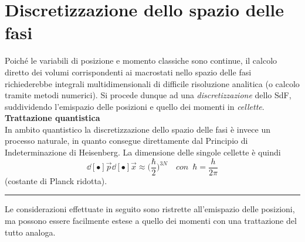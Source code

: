 \documentclass[10pt, oneside]{book}
\newcommand{\infobox}[2]{\vspace{0.5cm}~\\ \textbf{#1} \hrulefill \vspace{0.2cm}\\#2 {}\,\\\hrule \vspace{0.5cm}}
\begin{document}
\section{Discretizzazione dello spazio delle fasi}
Poiché le variabili di posizione e momento classiche sono continue, il calcolo diretto dei volumi corrispondenti ai macrostati nello spazio delle fasi richiederebbe integrali multidimensionali di difficile risoluzione analitica (o calcolo tramite metodi numerici). Si procede dunque ad una \textit{discretizzazione} dello SdF, suddividendo l'emispazio delle posizioni e quello dei momenti in \textit{cellette}. 
\infobox{Trattazione quantistica}{In ambito quantistico la discretizzazione dello spazio delle fasi è invece un processo naturale, in quanto consegue direttamente dal Principio di Indeterminazione di Heisenberg. La dimensione delle singole cellette è quindi
\[\dd[•]{\vec{p}}\dd[•]{\vec{x}} \approx \bigg( \frac{\hbar}{2} \bigg)^{3N} \quad con \enspace \hbar = \frac{h}{2 \pi}\]
(costante di Planck ridotta).
}
Le considerazioni effettuate in seguito sono ristrette all'emispazio delle posizioni, ma possono essere facilmente estese a quello dei momenti con una trattazione del tutto analoga.
\end{document}
